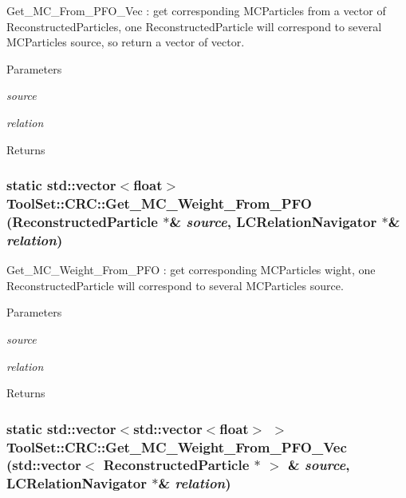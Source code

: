 Get\_\-MC\_\-From\_\-PFO\_\-Vec : get corresponding MCParticles from a vector of ReconstructedParticles, one ReconstructedParticle will correspond to several MCParticles source, so return a vector of vector. 
\begin{DoxyParams}{Parameters}
\item[{\em source}]\item[{\em relation}]\end{DoxyParams}
\begin{DoxyReturn}{Returns}

\end{DoxyReturn}
\hypertarget{classToolSet_1_1CRC_aa8c717051631a9f7e31097e458c060ad}{
\subsubsection[{Get\_\-MC\_\-Weight\_\-From\_\-PFO}]{\setlength{\rightskip}{0pt plus 5cm}static std::vector$<$float$>$ ToolSet::CRC::Get\_\-MC\_\-Weight\_\-From\_\-PFO (ReconstructedParticle $\ast$\& {\em source}, \/  LCRelationNavigator $\ast$\& {\em relation})}}
\label{classToolSet_1_1CRC_aa8c717051631a9f7e31097e458c060ad}


Get\_\-MC\_\-Weight\_\-From\_\-PFO : get corresponding MCParticles wight, one ReconstructedParticle will correspond to several MCParticles source. 
\begin{DoxyParams}{Parameters}
\item[{\em source}]\item[{\em relation}]\end{DoxyParams}
\begin{DoxyReturn}{Returns}

\end{DoxyReturn}
\hypertarget{classToolSet_1_1CRC_aaaca6d608e731f498833598f0c611b34}{
\subsubsection[{Get\_\-MC\_\-Weight\_\-From\_\-PFO\_\-Vec}]{\setlength{\rightskip}{0pt plus 5cm}static std::vector$<$std::vector$<$float$>$ $>$ ToolSet::CRC::Get\_\-MC\_\-Weight\_\-From\_\-PFO\_\-Vec (std::vector$<$ ReconstructedParticle $\ast$ $>$ \& {\em source}, \/  LCRelationNavigator $\ast$\& {\em relation})}}
\label{classToolSet_1_1CRC_aaaca6d608e731f498833598f0c611b34}


